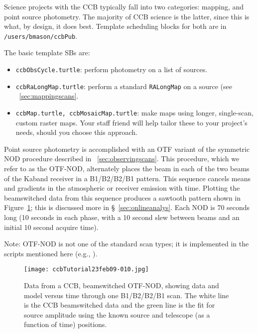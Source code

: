 Science projects with the CCB typically fall into two categories:
mapping, and point source photometry.  The majority of CCB science is
the latter, since this is what, by design, it does best. Template
scheduling blocks for both are in {\tt /users/bmason/ccbPub}. 

\begin{center}
\end{center}

\noindent The basic template \glspl{SB} are:
\begin{itemize}
\item {\tt ccbObsCycle.turtle}: perform photometry
on a list of sources.
\item {\tt ccbRaLongMap.turtle}: perform a standard {\tt RALongMap} on
a source (see ~\ref{sec:mappingscans}.
\item {\tt ccbMap.turtle, ccbMosaicMap.turtle}: make maps using longer,
single-scan, custom raster maps.  Your staff friend will help tailor
these to your project's needs, should  you choose this approach.
\end{itemize}

Point source photometry is accomplished with an \gls{OTF} variant of
the symmetric NOD procedure described in ~\ref{sec:observingscans}.
This procedure, which we refer to as the
OTF-NOD, alternately places the beam in each of the two beams of the
\gls{Kaband} receiver in a B1/B2/B2/B1 pattern.  This sequence cancels
means and gradients in the atmospheric or receiver emission with time.
Plotting the beamswitched data from this sequence produces a sawtooth
pattern shown in Figure~\ref{fig:otfnodconcept}; this is discussed
more in \S~\ref{sec:onlineanalys}.  Each NOD is 70 seconds long (10
seconds in each phase, with a 10 second slew between beams and an
initial 10 second acquire time).

Note: OTF-NOD is not one of the standard scan types; it is implemented in 
the scripts mentioned here (e.g., ).

\begin{figure}
\texttt{[image: ccbTutorial23feb09-010.jpg]}
\caption[Data from a CCB, beamswitched OTF-NOD]
{Data from a CCB, beamswitched OTF-NOD, showing data and model
versus time through one B1/B2/B2/B1 scan. The white line is the CCB
beamswitched data and the green line is the fit for source amplitude
using the known source and telescope (as a function of time)
positions.}
\label{fig:otfnodconcept}
\end{figure}


